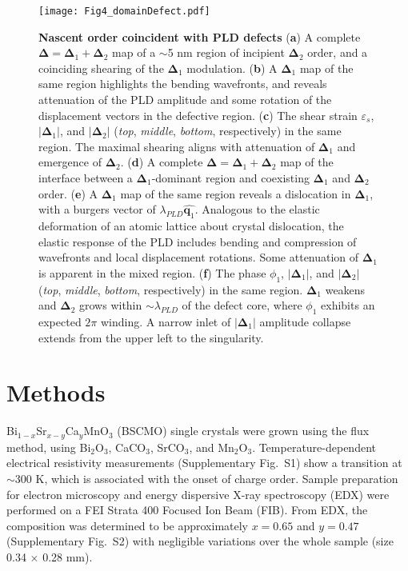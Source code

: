 \documentclass[12pt]{article}
\begin{document}
\begin{figure}
  \texttt{[image: Fig4\_domainDefect.pdf]}
  \caption{\textbf{Nascent order coincident with PLD defects} (\textbf{a}) A complete $\mathbf{\Delta}=\mathbf{\Delta}_1 + \mathbf{\Delta}_2$ map of a $\sim$5 nm region of incipient $\mathbf{\Delta}_2$ order, and a coinciding shearing of the $\mathbf{\Delta}_1$ modulation. (\textbf{b}) A $\mathbf{\Delta}_1$ map of the same region highlights the bending wavefronts, and reveals attenuation of the PLD amplitude and some rotation of the displacement vectors in the defective region.  (\textbf{c})  The shear strain $\varepsilon_s$, $\lvert\mathbf{\Delta}_1\rvert$, and $\lvert\mathbf{\Delta}_2\rvert$ (\textit{top}, \textit{middle}, \textit{bottom}, respectively) in the same region.  The maximal shearing aligns with attenuation of $\mathbf{\Delta}_1$ and emergence of $\mathbf{\Delta}_2$.
(\textbf{d})  A complete $\mathbf{\Delta}=\mathbf{\Delta}_1 + \mathbf{\Delta}_2$ map of the interface between a $\mathbf{\Delta}_1$-dominant region and coexisting $\mathbf{\Delta}_1$ and $\mathbf{\Delta}_2$ order.  (\textbf{e}) A $\mathbf{\Delta}_1$ map of the same region reveals a dislocation in $\mathbf{\Delta}_1$, with a burgers vector of $\lambda_{PLD}\widehat{\mathbf{q}_1}$.  Analogous to the elastic deformation of an atomic lattice about crystal dislocation, the elastic response of the PLD includes bending and compression of wavefronts and local displacement rotations.  Some attenuation of $\mathbf{\Delta}_1$ is apparent in the mixed region.  (\textbf{f})  The phase $\phi_1$, $\lvert\mathbf{\Delta}_1\rvert$, and $\lvert\mathbf{\Delta}_2\rvert$ (\textit{top}, \textit{middle}, \textit{bottom}, respectively) in the same region.  $\mathbf{\Delta}_1$ weakens and $\mathbf{\Delta}_2$ grows within $\sim\lambda_{PLD}$ of the defect core, where $\phi_1$ exhibits an expected $2\pi$ winding.  A narrow inlet of $\lvert\mathbf{\Delta}_1\rvert$ amplitude collapse extends from the upper left to the singularity.
  }
	\label{F:Defects}
\end{figure}



\clearpage

\section*{Methods}

Bi$_{1-x}$Sr$_{x-y}$Ca$_{y}$MnO$_{3}$ (BSCMO) single crystals were grown using the flux method, using Bi$_2$O$_3$, CaCO$_3$, SrCO$_3$, and Mn$_2$O$_3$.
Temperature-dependent electrical resistivity measurements (Supplementary Fig.~S1) show a transition at $\sim$300 K, which is associated with the onset of charge order. 
Sample preparation for electron microscopy and energy dispersive X-ray spectroscopy (EDX) were performed on a FEI Strata 400 Focused Ion Beam (FIB). 
From EDX, the composition was determined to be approximately $x=0.65$ and $y=0.47$ (Supplementary Fig.~S2) with negligible variations over the whole sample (size 0.34 $\times$ 0.28 mm). 
\end{document}
